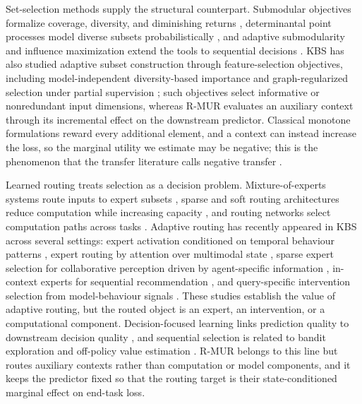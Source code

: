 Set-selection methods supply the structural counterpart. Submodular objectives
formalize coverage, diversity, and diminishing returns
\citep{lin2011class,nemhauser1978analysis,krause2014submodular}, determinantal
point processes model diverse subsets probabilistically
\citep{kulesza2012determinantal}, and adaptive submodularity and influence
maximization extend the tools to sequential decisions
\citep{golovin2011adaptive,leskovec2007cost}. KBS has also studied adaptive
subset construction through feature-selection objectives, including
model-independent diversity-based importance \citep{mousavi2025vsi} and
graph-regularized selection under partial supervision \citep{xie2025partial};
such objectives select informative or nonredundant input dimensions, whereas
R-MUR evaluates an auxiliary context through its incremental effect on the
downstream predictor. Classical monotone formulations reward every additional
element, and a context can instead increase the loss, so the marginal utility
we estimate may be negative; this is the phenomenon that the transfer
literature calls negative transfer
\citep{pan2010survey,torrey2010transfer,wang2019characterizing}.

Learned routing treats selection as a decision problem. Mixture-of-experts
systems route inputs to expert subsets
\citep{jacobs1991adaptive,shazeer2017outrageously,zhou2022mixture}, sparse and
soft routing architectures reduce computation while increasing capacity
\citep{fedus2022switch,lewis2021base,roller2021hash,puigcerver2024sparse}, and
routing networks select computation paths across tasks
\citep{rosenbaum2018routing,ma2018modeling}. Adaptive routing has recently
appeared in KBS across several settings: expert activation conditioned on
temporal behaviour patterns \citep{chen2024bpmoe}, expert routing by attention
over multimodal state \citep{dream2026routing}, sparse expert selection for
collaborative perception driven by agent-specific information
\citep{cogmoe2026sparse}, in-context experts for sequential recommendation
\citep{sun2025adaptive}, and query-specific intervention selection from
model-behaviour signals \citep{failuremode2026routing}. These studies establish the value
of adaptive routing, but the routed object is an expert, an intervention, or a
computational component. Decision-focused learning links
prediction quality to downstream decision quality
\citep{bertsimas2020predictive,elmachtoub2022smart,wilder2019melding,mandi2024decision},
and sequential selection is related to bandit exploration and off-policy value
estimation \citep{auer2002finite,dudik2011doubly}. R-MUR belongs to this line
but routes auxiliary contexts rather than computation or model components, and
it keeps the predictor fixed so that the routing target is their
state-conditioned marginal effect on end-task loss.
